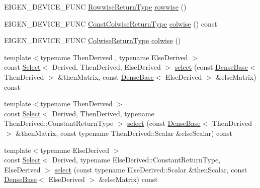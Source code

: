 \begin{DoxyCompactItemize}
\item 
E\+I\+G\+E\+N\+\_\+\+D\+E\+V\+I\+C\+E\+\_\+\+F\+U\+NC \mbox{\hyperlink{class_eigen_1_1_vectorwise_op}{Rowwise\+Return\+Type}} \mbox{\hyperlink{class_eigen_1_1_dense_base_a6daa3a3156ca0e0722bf78638e1c7f28}{rowwise}} ()
\item 
E\+I\+G\+E\+N\+\_\+\+D\+E\+V\+I\+C\+E\+\_\+\+F\+U\+NC \mbox{\hyperlink{class_eigen_1_1_vectorwise_op}{Const\+Colwise\+Return\+Type}} \mbox{\hyperlink{class_eigen_1_1_dense_base_a978724c07b70cb9b8fdef67a4de08788}{colwise}} () const
\item 
E\+I\+G\+E\+N\+\_\+\+D\+E\+V\+I\+C\+E\+\_\+\+F\+U\+NC \mbox{\hyperlink{class_eigen_1_1_vectorwise_op}{Colwise\+Return\+Type}} \mbox{\hyperlink{class_eigen_1_1_dense_base_a1c0e1b6067ec1de6cb8799da55aa7d30}{colwise}} ()
\item 
{\footnotesize template$<$typename Then\+Derived , typename Else\+Derived $>$ }\\const \mbox{\hyperlink{class_eigen_1_1_select}{Select}}$<$ Derived, Then\+Derived, Else\+Derived $>$ \mbox{\hyperlink{class_eigen_1_1_dense_base_a65e78cfcbc9852e6923bebff4323ddca}{select}} (const \mbox{\hyperlink{class_eigen_1_1_dense_base}{Dense\+Base}}$<$ Then\+Derived $>$ \&then\+Matrix, const \mbox{\hyperlink{class_eigen_1_1_dense_base}{Dense\+Base}}$<$ Else\+Derived $>$ \&else\+Matrix) const
\item 
{\footnotesize template$<$typename Then\+Derived $>$ }\\const \mbox{\hyperlink{class_eigen_1_1_select}{Select}}$<$ Derived, Then\+Derived, typename Then\+Derived\+::\+Constant\+Return\+Type $>$ \mbox{\hyperlink{class_eigen_1_1_dense_base_a57ef09a843004095f84c198dd145641b}{select}} (const \mbox{\hyperlink{class_eigen_1_1_dense_base}{Dense\+Base}}$<$ Then\+Derived $>$ \&then\+Matrix, const typename Then\+Derived\+::\+Scalar \&else\+Scalar) const
\item 
{\footnotesize template$<$typename Else\+Derived $>$ }\\const \mbox{\hyperlink{class_eigen_1_1_select}{Select}}$<$ Derived, typename Else\+Derived\+::\+Constant\+Return\+Type, Else\+Derived $>$ \mbox{\hyperlink{class_eigen_1_1_dense_base_a9e8e78c75887d4539071a0b7a61ca103}{select}} (const typename Else\+Derived\+::\+Scalar \&then\+Scalar, const \mbox{\hyperlink{class_eigen_1_1_dense_base}{Dense\+Base}}$<$ Else\+Derived $>$ \&else\+Matrix) const
\item 
\mbox{\label{class_eigen_1_1_dense_base_a7f4a720248190c3637a48e22ab66c835}} 

\end{DoxyCompactItemize}
